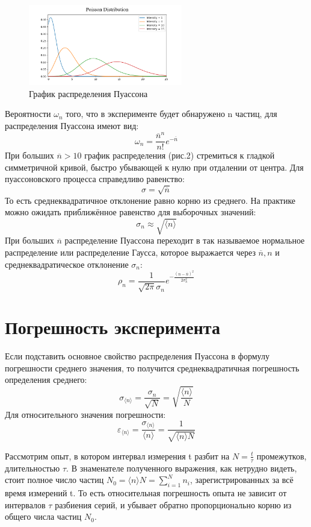\documentclass[a4paper]{article}
\begin{document}
\begin{figure}[t]
    \centering
    \includegraphics[width=0.6\textwidth]{process.png}
    \caption{График распределения Пуассона}
\end{figure}

Вероятности $\omega_{n}$ того, что в эксперименте будет обнаружено n частиц, для распределения Пуассона имеют вид:
\[\omega_{n} =  \frac{\overline{n}^{n}}{n!} e^{-\overline{n}}\]
\newline
При больших $\overline{n} > 10$ график распределения (рис.2) стремиться к гладкой симметричной кривой, быстро убывающей к нулю при отдалении от центра.
\newline
Для пуассоновского процесса справедливо равенство:
\[\sigma = \sqrt{\overline{n}}\]
То есть среднеквадратичное отклонение равно корню из среднего. На практике можно ожидать приближённое равенство для выборочных значений:
\[\sigma_{n} \approx \sqrt{\langle n \rangle}\]
При больших $\overline{n}$ распределение Пуассона переходит в так называемое нормальное распределение или распределение Гаусса, которое выражается через $\overline{n}, n$ и среднеквадратическое отклонение $\sigma_{n}$:
\[\rho_{n} = \frac{1}{\sqrt{2\pi}\sigma_{n}}e^{-\frac{(n - \overline{n})^2}{2\sigma_{n}^2}}\]
\section{Погрешность эксперимента}

Если подставить основное свойство распределения Пуассона в формулу погрешности среднего значения, то получится среднеквадратичная погрешность определения среднего:
\[\sigma_{\langle n \rangle} = \frac{\sigma_{n}}{\sqrt{N}} = \sqrt{\frac{\langle n \rangle}{N}}\]
Для относительного значения погрешности:
\[\varepsilon_{\langle n \rangle} = \frac{\sigma_{\langle n \rangle}}{\langle n \rangle} = \frac{1}{\sqrt{\langle n \rangle N}}\]

Рассмотрим опыт, в котором интервал измерения t разбит на $N = \frac{t}{\tau}$ промежутков, длительностью $\tau$. В знаменателе полученного выражения, как нетрудно видеть, стоит полное число частиц $N_{0} = \langle n \rangle N = \sum\limits_{i=1}^{N} n_{i}$, зарегистрированных за всё время измерений t. То есть относительная погрешность опыта не зависит от интервалов $\tau$ разбиения серий, и убывает обратно пропорционально корню из общего числа частиц $N_{0}$.
\end{document}
